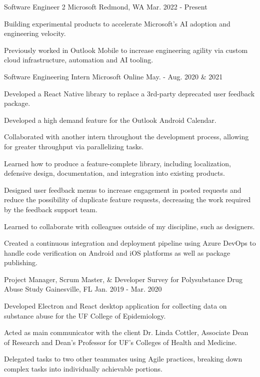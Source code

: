 \begin{cventries}
  \cventry
    {Software Engineer 2}
    {Microsoft}
    {Redmond, WA}
    {Mar. 2022 - Present}
    {
      \begin{cvitems}
        \item{Building experimental products to accelerate Microsoft's AI adoption and engineering velocity.}
        \item{Previously worked in Outlook Mobile to increase engineering agility via custom cloud infrastructure, automation and AI tooling.}
      \end{cvitems}
    }
  \cventry
    {Software Engineering Intern}
    {Microsoft}
    {Online}
    {May. - Aug. 2020 \& 2021}
    {
      \begin{cvitems}
        \item{Developed a React Native library to replace a 3rd-party deprecated user feedback package.}
        \item{Developed a high demand feature for the Outlook Android Calendar.}
        \item{Collaborated with another intern throughout the development process, allowing for greater throughput via parallelizing tasks.}
        \item{Learned how to produce a feature-complete library, including localization, defensive design, documentation, and integration into existing products.}
        \item{Designed user feedback menus to increase engagement in posted requests and reduce the possibility of duplicate feature requests, decreasing the work required by the feedback support team.}
        \item{Learned to collaborate with colleagues outside of my discipline, such as designers.}
        \item{Created a continuous integration and deployment pipeline using Azure DevOps to handle code verification on Android and iOS platforms as well as package publishing.}
      \end{cvitems}
    }
  \cventry
    {Project Manager, Scrum Master, \& Developer}
    {Survey for Polysubstance Drug Abuse Study}
    {Gainesville, FL}
    {Jan. 2019 - Mar. 2020}
    {
      \begin{cvitems}
        \item {Developed Electron and React desktop application for collecting data on substance abuse for the UF College of Epidemiology.}
        \item {Acted as main communicator with the client Dr. Linda Cottler, Associate Dean of Research and Dean's Professor for UF's Colleges of Health and Medicine.}
        \item {Delegated tasks to two other teammates using Agile practices, breaking down complex tasks into individually achievable portions.}
      \end{cvitems}
    }
\end{cventries}
